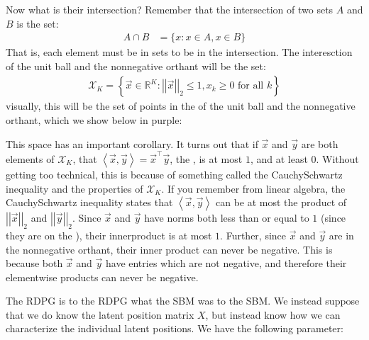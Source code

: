 \documentclass[letterpaper,10pt,english]{jupyterBook}
\begin{document}
\noindent{}

\sphinxAtStartPar
Now what is their intersection? Remember that the intersection of two sets \(A\) and \(B\) is the set:
\begin{align*}
    A \cap B &= \{x : x \in A, x \in B\}
\end{align*}
\sphinxAtStartPar
That is, each element must be in  sets to be in the intersection. The interesction of the unit ball and the non\sphinxhyphen{}negative orthant will be the set:
\begin{align*}
   \mathcal X_K = \left\{\vec x \in \mathbb R^K :\left|\left|\vec x\right|\right|_2 \leq 1, x_k \geq 0 \textrm{ for all $k$}\right\}
\end{align*}
\sphinxAtStartPar
visually, this will be the set of points in the  of the unit ball and the non\sphinxhyphen{}negative orthant, which we show below in purple:

\noindent{}

\sphinxAtStartPar
This space has an  important corollary. It turns out that if \(\vec x\) and \(\vec y\) are both elements of \(\mathcal X_K\), that \(\left\langle \vec x, \vec y \right \rangle = \vec x^\top \vec y\), the , is at most \(1\), and at least \(0\). Without getting too technical, this is because of something called the Cauchy\sphinxhyphen{}Schwartz inequality and the properties of \(\mathcal X_K\). If you remember from linear algebra, the Cauchy\sphinxhyphen{}Schwartz inequality states that \(\left\langle \vec x, \vec y \right \rangle\) can be at most the product of \(\left|\left|\vec x\right|\right|_2\) and \(\left|\left|\vec y\right|\right|_2\). Since \(\vec x\) and \(\vec y\) have norms both less than or equal to \(1\) (since they are on the ), their inner\sphinxhyphen{}product is at most \(1\). Further, since \(\vec x\) and \(\vec y\) are in the non\sphinxhyphen{}negative orthant, their inner product can never be negative. This is because both \(\vec x\) and \(\vec y\) have entries which are not negative, and therefore their element\sphinxhyphen{}wise products can never be negative.

\sphinxAtStartPar
The  RDPG is to the  RDPG what the  SBM was to the  SBM. We instead suppose that we do  know the latent position matrix \(X\), but instead know how we can characterize the individual latent positions. We have the following parameter:
\end{document}
